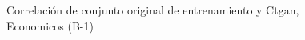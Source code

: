 \begin{figure}[H]
    \centering
    
    \caption{Correlación de conjunto original de entrenamiento y Ctgan, Economicos (B-1)}
    \label{pairwise-economicos-b-1-ctgan}
\end{figure}